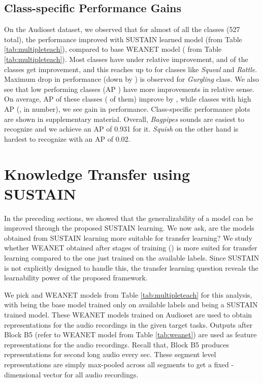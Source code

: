 \documentclass{article}
\begin{document}
\subsection{Class-specific Performance Gains}
On the Audioset dataset, we observed that for almost  of all the classes (527 total), the performance improved with SUSTAIN learned model  (from Table \ref{tab:multipleteach}), compared to base WEANET model ( from Table \ref{tab:multipleteach}). 
Most classes have under  relative improvement, and  of the classes get  improvement, and this reaches up to  for classes like \emph{Squeal} and \emph{Rattle}. 
Maximum drop in performance (down by ) is observed for \emph{Gurgling} class. 
We also see that low performing classes (AP ) have more improvements in relative sense. 
On average, AP of these classes ( of them) improve by , while classes with high AP (,  in number), we see  gain in performance. Class-specific performance plots are shown in supplementary material. Overall, \emph{Bagpipes} sounds are easiest to recognize and we achieve an AP of 0.931 for it. \emph{Squish} on the other hand is hardest to recognize with an AP of 0.02.


\section{Knowledge Transfer using SUSTAIN} \label{sec:transfer}

In the preceding sections, we showed that the generalizability of a model can be improved through the proposed SUSTAIN learning. We now ask, are the models obtained from SUSTAIN learning more suitable for transfer learning? 
We study whether WEANET obtained after  stages of training () is more suited for transfer learning compared to the one just trained on the available labels.
Since SUSTAIN is not explicitly designed to handle this, the transfer learning question reveals the learnability power of the proposed framework. 

We pick  and  WEANET models from Table \ref{tab:multipleteach} for this analysis, with   being the base model trained only on available labels and  being a SUSTAIN trained model. These WEANET models trained on Audioset are used to obtain representations for the audio recordings in the given target tasks. 
Outputs after Block B5 (refer to WEANET model from Table \ref{tab:weanet}) are used as feature representations for the audio recordings. 
Recall that, Block B5 produces representations for  second long audio every  sec. These segment level representations are simply max-pooled across all segments to get a fixed -dimensional vector for all audio recordings. 
\end{document}
